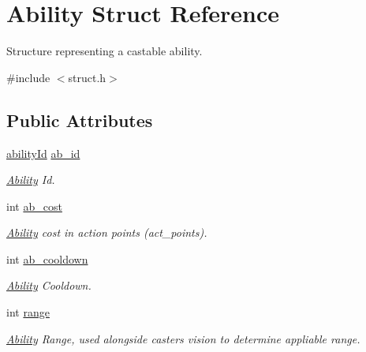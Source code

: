 \hypertarget{struct_ability}{}\section{Ability Struct Reference}
\label{struct_ability}


Structure representing a castable ability.  




{\ttfamily \#include $<$struct.\+h$>$}

\subsection*{Public Attributes}
\begin{DoxyCompactItemize}
\item 
\mbox{\label{struct_ability_a241fca6ef56ea17cbd0786e316af1518}} 
\hyperlink{substruct_8h_a474a755e4cfa53534567029009496507}{ability\+Id} \hyperlink{struct_ability_a241fca6ef56ea17cbd0786e316af1518}{ab\+\_\+id}
\begin{DoxyCompactList}\small\item\em \hyperlink{struct_ability}{Ability} Id. \end{DoxyCompactList}\item 
\mbox{\label{struct_ability_ad2542a2f5b2e180534c035010ff86eaa}} 
int \hyperlink{struct_ability_ad2542a2f5b2e180534c035010ff86eaa}{ab\+\_\+cost}
\begin{DoxyCompactList}\small\item\em \hyperlink{struct_ability}{Ability} cost in action points (act\+\_\+points). \end{DoxyCompactList}\item 
\mbox{\label{struct_ability_a7147800c2b3c37b8b617da17aada04a7}} 
int \hyperlink{struct_ability_a7147800c2b3c37b8b617da17aada04a7}{ab\+\_\+cooldown}
\begin{DoxyCompactList}\small\item\em \hyperlink{struct_ability}{Ability} Cooldown. \end{DoxyCompactList}\item 
\mbox{\label{struct_ability_afcf8b94216dbe4187fbed7d6bf2ec6f5}} 
int \hyperlink{struct_ability_afcf8b94216dbe4187fbed7d6bf2ec6f5}{range}
\begin{DoxyCompactList}\small\item\em \hyperlink{struct_ability}{Ability} Range, used alongside caster\textquotesingle{}s vision to determine appliable range. \end{DoxyCompactList}\item 

\end{DoxyCompactItemize}
